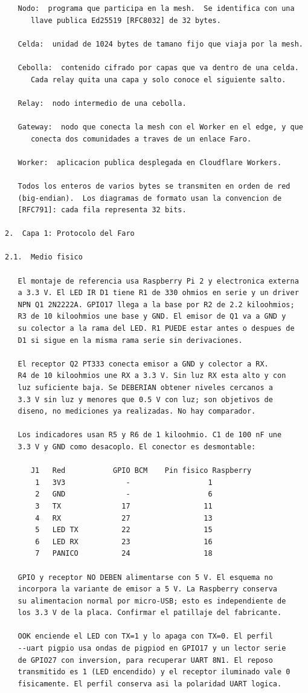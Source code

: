\newpage
\begin{Verbatim}
   Nodo:  programa que participa en la mesh.  Se identifica con una
      llave publica Ed25519 [RFC8032] de 32 bytes.

   Celda:  unidad de 1024 bytes de tamano fijo que viaja por la mesh.

   Cebolla:  contenido cifrado por capas que va dentro de una celda.
      Cada relay quita una capa y solo conoce el siguiente salto.

   Relay:  nodo intermedio de una cebolla.

   Gateway:  nodo que conecta la mesh con el Worker en el edge, y que
      conecta dos comunidades a traves de un enlace Faro.

   Worker:  aplicacion publica desplegada en Cloudflare Workers.

   Todos los enteros de varios bytes se transmiten en orden de red
   (big-endian).  Los diagramas de formato usan la convencion de
   [RFC791]: cada fila representa 32 bits.

2.  Capa 1: Protocolo del Faro

2.1.  Medio fisico

   El montaje de referencia usa Raspberry Pi 2 y electronica externa
   a 3.3 V. El LED IR D1 tiene R1 de 330 ohmios en serie y un driver
   NPN Q1 2N2222A. GPIO17 llega a la base por R2 de 2.2 kiloohmios;
   R3 de 10 kiloohmios une base y GND. El emisor de Q1 va a GND y
   su colector a la rama del LED. R1 PUEDE estar antes o despues de
   D1 si sigue en la misma rama serie sin derivaciones.

   El receptor Q2 PT333 conecta emisor a GND y colector a RX.
   R4 de 10 kiloohmios une RX a 3.3 V. Sin luz RX esta alto y con
   luz suficiente baja. Se DEBERIAN obtener niveles cercanos a
   3.3 V sin luz y menores que 0.5 V con luz; son objetivos de
   diseno, no mediciones ya realizadas. No hay comparador.

   Los indicadores usan R5 y R6 de 1 kiloohmio. C1 de 100 nF une
   3.3 V y GND como desacoplo. El conector es desmontable:

      J1   Red           GPIO BCM    Pin fisico Raspberry
       1   3V3              -                  1
       2   GND              -                  6
       3   TX              17                 11
       4   RX              27                 13
       5   LED TX          22                 15
       6   LED RX          23                 16
       7   PANICO          24                 18

   GPIO y receptor NO DEBEN alimentarse con 5 V. El esquema no
   incorpora la variante de emisor a 5 V. La Raspberry conserva
   su alimentacion normal por micro-USB; esto es independiente de
   los 3.3 V de la placa. Confirmar el patillaje del fabricante.

   OOK enciende el LED con TX=1 y lo apaga con TX=0. El perfil
   --uart pigpio usa ondas de pigpiod en GPIO17 y un lector serie
   de GPIO27 con inversion, para recuperar UART 8N1. El reposo
   transmitido es 1 (LED encendido) y el receptor iluminado vale 0
   fisicamente. El perfil conserva asi la polaridad UART logica.
\end{Verbatim}
